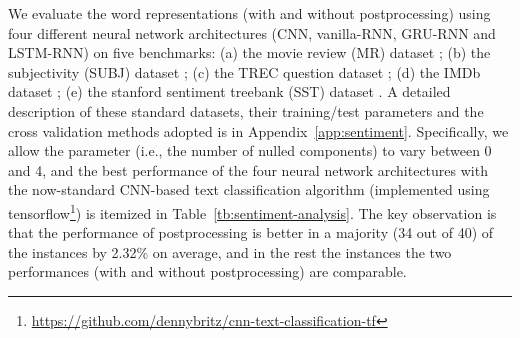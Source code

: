 \documentclass{article} \usepackage{acl2017,times}
\begin{document}
We evaluate the word representations (with and without postprocessing) using  four different neural network architectures (CNN, vanilla-RNN, GRU-RNN and LSTM-RNN) on  five benchmarks: (a) the movie review (MR) dataset \citep{pang2005seeing}; (b) the subjectivity (SUBJ) dataset \citep{pang2004sentimental}; (c) the TREC question dataset \citep{li2002learning}; (d) the IMDb dataset \citep{maas2011learning}; (e) the stanford sentiment treebank (SST) dataset \citep{socher2013reasoning}.  A detailed description of these standard datasets, their training/test parameters and the cross validation methods adopted is in Appendix~\ref{app:sentiment}. { Specifically, we allow the parameter  (i.e., the number of nulled components) to vary between 0 and 4, and the best performance of the  four  neural network architectures with the now-standard CNN-based text classification algorithm \citep{kim2014convolutional} (implemented using tensorflow\footnote{\url{https://github.com/dennybritz/cnn-text-classification-tf}})  is itemized in Table~\ref{tb:sentiment-analysis}.  The key observation is that the performance of postprocessing is better in a majority (34 out of 40) of the instances by 2.32\% on average, and in the rest the instances the two performances (with and without postprocessing) are comparable. }
\end{document}
